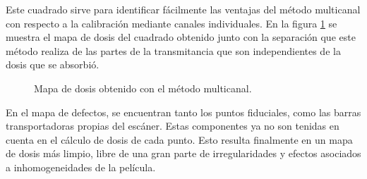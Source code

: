 Este cuadrado sirve para identificar fácilmente las ventajas del método multicanal con respecto a la calibración mediante canales individuales. En la figura \ref{fig:MapaCuadrado} se muestra el mapa de dosis del cuadrado obtenido junto con la separación que este método realiza de las partes de la transmitancia que son independientes de la dosis que se absorbió.\\
\begin{figure}[H]
	\centering
	\hfill
	\caption{Mapa de dosis obtenido con el método multicanal.}
	\label{fig:MapaCuadrado}
\end{figure}

En el mapa de defectos, se encuentran tanto los puntos fiduciales, como las barras transportadoras propias del escáner. Estas componentes ya no son tenidas en cuenta en el cálculo de dosis de cada punto. Esto resulta finalmente en un mapa de dosis más limpio, libre de una gran parte de irregularidades y efectos asociados a inhomogeneidades de la película.\\


